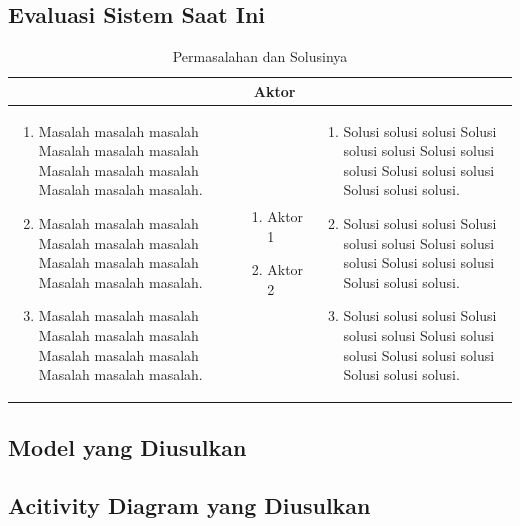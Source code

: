 \subsection{Evaluasi Sistem Saat Ini}

\begin{table}[ht]
\centering
\caption{Permasalahan dan Solusinya}
\begin{tabular}{|>{\raggedright}p{5cm}|p{2.5cm}|>{\raggedright}p{5cm}|}
 \hline
 \multicolumn{1}{|c}{\bfseries Masalah} & \multicolumn{1}{|c|}{\bfseries Aktor} & \multicolumn{1}{c|}{\bfseries Solusi} \\ 
  \hline
\begin{enumerate}
   	\item Masalah masalah masalah Masalah masalah masalah Masalah masalah masalah Masalah masalah masalah.
   	\item Masalah masalah masalah Masalah masalah masalah Masalah masalah masalah Masalah masalah masalah.
   	\item Masalah masalah masalah Masalah masalah masalah Masalah masalah masalah Masalah masalah masalah.
   \end{enumerate} &
   \begin{enumerate}
  	\item Aktor 1
  	\item Aktor 2
  \end{enumerate} &
  \begin{enumerate}
  \item Solusi solusi solusi Solusi solusi solusi Solusi solusi solusi Solusi solusi solusi Solusi solusi solusi.
  \item Solusi solusi solusi Solusi solusi solusi Solusi solusi solusi Solusi solusi solusi Solusi solusi solusi.
  \item Solusi solusi solusi Solusi solusi solusi Solusi solusi solusi Solusi solusi solusi Solusi solusi solusi.
  \end{enumerate}
     \tabularnewline
  \hline
 \end{tabular}
\end{table}

\subsection{Model yang Diusulkan}

\subsection{Acitivity Diagram yang Diusulkan}

